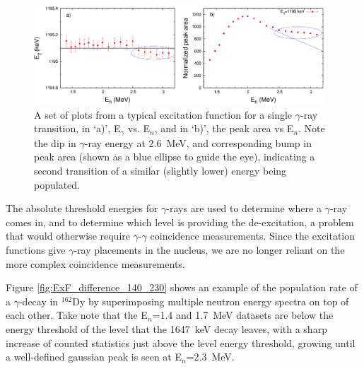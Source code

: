 \begin{figure}[h!]
\begin{center}
\includegraphics[width=0.97\textwidth]{sample_exf.eps}
\caption{A set of plots from a typical excitation function for a single $\gamma$-ray transition, in `a)', E$_\gamma$ vs. E$_n$, and in `b)', the peak area vs E$_n$. Note the dip in $\gamma$-ray energy at 2.6~MeV, and corresponding bump in peak area (shown as a blue ellipse to guide the eye), indicating a second transition of a similar (slightly lower) energy being populated.
\label{fig:sample_exf}}
\end{center}
\end{figure}

The absolute threshold energies for $\gamma$-rays are used to determine where a $\gamma$-ray comes in, and to determine which level is providing the de-excitation, a problem that would otherwise require $\gamma$-$\gamma$ coincidence measurements. Since the excitation functions give $\gamma$-ray placements in the nucleus, we are no longer reliant on the more complex coincidence measurements. 

Figure \ref{fig:ExF_difference_140_230} shows an example of the population rate of a $\gamma$-decay in $^{162}$Dy by superimposing multiple neutron energy spectra on top of each other. Take note that the E$_n$=1.4 and 1.7~MeV datasets are below the energy threshold of the level that the 1647~keV decay leaves, with a sharp increase of counted statistics just above the level energy threshold, growing until a well-defined gaussian peak is seen at E$_n$=2.3~MeV.

